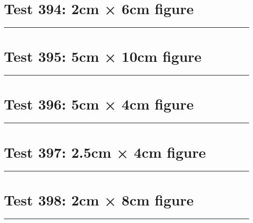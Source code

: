 \documentclass[a4paper,11pt]{article}
\begin{document}
\section*{Test 394: 2cm × 6cm figure}
\begin{swarmwrap}%
  \begin{minipage}[t]{2cm}
    \centering
    \rule{\linewidth}{6cm}
  \end{minipage}%
\end{swarmwrap}%
\swarmwrapnext
\lipsum[131]
\lipsum[132]
\lipsum[133]
\section*{Test 395: 5cm × 10cm figure}
\begin{swarmwrap}%
  \begin{minipage}[t]{5cm}
    \centering
    \rule{\linewidth}{10cm}
  \end{minipage}%
\end{swarmwrap}%
\swarmwrapnext
\lipsum[88]
\lipsum[89]
\lipsum[90]
\section*{Test 396: 5cm × 4cm figure}
\begin{swarmwrap}%
  \begin{minipage}[t]{5cm}
    \centering
    \rule{\linewidth}{4cm}
  \end{minipage}%
\end{swarmwrap}%
\swarmwrapnext
\lipsum[41]
\lipsum[42]
\lipsum[43]
\lipsum[44]
\lipsum[45]
\lipsum[46]
\section*{Test 397: 2.5cm × 4cm figure}
\begin{swarmwrap}%
  \begin{minipage}[t]{2cm}
    \centering
    \rule{\linewidth}{4cm}
  \end{minipage}%
\end{swarmwrap}%
\swarmwrapnext
\lipsum[114]
\lipsum[115]
\lipsum[116]
\lipsum[117]
\section*{Test 398: 2cm × 8cm figure}
\begin{swarmwrap}%
  \begin{minipage}[t]{2cm}
    \centering
    \rule{\linewidth}{8cm}
  \end{minipage}%
\end{swarmwrap}%
\swarmwrapnext
\lipsum[62]
\lipsum[63]
\lipsum[64]
\lipsum[65]
\lipsum[66]
\end{document}
